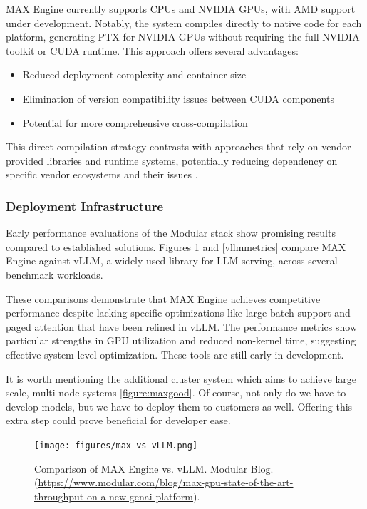 \documentclass[manuscript,screen,review,format=acmsmall]{acmart}
\begin{document}
MAX Engine currently supports CPUs and NVIDIA GPUs, with AMD support under development. Notably, the system compiles directly to native code for each platform, generating PTX for NVIDIA GPUs without requiring the full NVIDIA toolkit or CUDA runtime. This approach offers several advantages:

\begin{itemize}
    \item Reduced deployment complexity and container size
    \item Elimination of version compatibility issues between CUDA components
    \item Potential for more comprehensive cross-compilation
\end{itemize}

This direct compilation strategy contrasts with approaches that rely on vendor-provided libraries and runtime systems, potentially reducing dependency on specific vendor ecosystems and their issues \cite{Modular4}.

\subsubsection{Deployment Infrastructure}

Early performance evaluations of the Modular stack show promising results compared to established solutions. Figures \ref{vllmthroughput} and \ref{vllmmetrics} compare MAX Engine against vLLM, a widely-used library for LLM serving, across several benchmark workloads.

These comparisons demonstrate that MAX Engine achieves competitive performance despite lacking specific optimizations like large batch support and paged attention\cite{maxgpu} that have been refined in vLLM. The performance metrics show particular strengths in GPU utilization and reduced non-kernel time, suggesting effective system-level optimization. These tools are still early in development.

It is worth mentioning the additional cluster system which aims to achieve large scale, multi-node systems \ref{figure:maxgood}. Of course, not only do we have to develop models, but we have to deploy them to customers as well. Offering this extra step could prove beneficial for developer ease.

\begin{figure}[h]
    \label{vllmthroughput}
  \centering
  \texttt{[image: figures/max-vs-vLLM.png]}
  \caption{Comparison of MAX Engine vs. vLLM.
    Modular Blog. (\url{https://www.modular.com/blog/max-gpu-state-of-the-art-throughput-on-a-new-genai-platform}).}
\end{figure}
\end{document}
